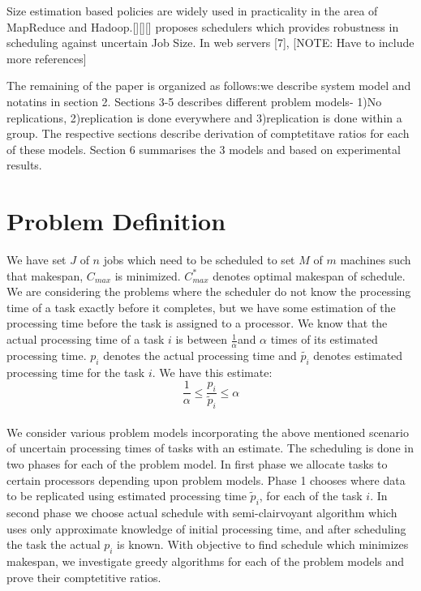\documentclass[10pt, conference, compsocconf]{IEEEtran}
\begin{document}
Size estimation based policies are widely used in practicality in the area of MapReduce and Hadoop.[][][] proposes schedulers which provides robustness in scheduling against uncertain Job Size.  In web servers [7], [NOTE: Have to include more references] 

The remaining of the paper is organized as follows:we describe system model and notatins in section 2. Sections 3-5 describes different problem models- 1)No replications, 2)replication is done everywhere and 3)replication is done within a group. The respective sections describe derivation of comptetitave ratios for each of these models. Section 6 summarises the 3 models and based on experimental results.  

\section{Problem Definition}
We have set $J$ of $n$ jobs which need to be scheduled to set $M$ of $m$ machines such that makespan, $C_{max}$ is minimized.   $C_{max}^{*}$ denotes optimal makespan of schedule.   We are considering the problems where the scheduler do not know the processing time of a task exactly before it completes, but we have some estimation of the processing time before the task is assigned to a processor. We know that the actual processing time of a task $i$ is between $\frac{1}{\alpha}$and $\alpha$ times of its estimated processing time. $p_i$ denotes the actual processing time and $\tilde {p_i}$ denotes
estimated processing time for the task $i$.  We have this estimate:\\
\begin{equation} 
\frac{1}{\alpha}\leq \frac{p_{i}}{\tilde{p}_{i}}\leq \alpha
\end{equation}\\


We consider various problem models  incorporating the above mentioned scenario of uncertain processing times of tasks with an estimate. The scheduling is done in two phases for each of the problem model.  In first phase we allocate tasks to certain processors depending upon problem models.  Phase 1 chooses where data to be  replicated using estimated processing time $\tilde p_i $, for each of the task $i$.  In second phase we choose actual schedule with semi-clairvoyant algorithm which uses only approximate knowledge of initial processing time, and after scheduling the task the actual $p_i$ is known.  With  objective to find schedule which minimizes makespan, we investigate greedy algorithms for each of the problem models and prove their comptetitive ratios. \\
\end{document}
